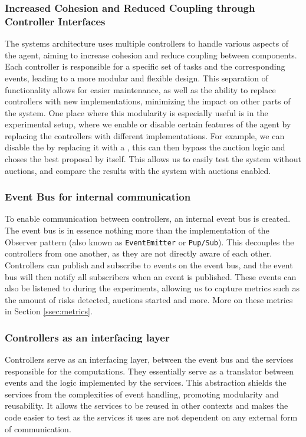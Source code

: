 \subsubsection{Increased Cohesion and Reduced Coupling through Controller Interfaces}
\label{sssec:reduced-cohesion-coupling}
The systems architecture uses multiple controllers to handle various aspects of the agent, aiming to increase cohesion and reduce coupling between components. Each controller is responsible for a specific set of tasks and the corresponding events, leading to a more modular and flexible design. This separation of functionality allows for easier maintenance, as well as the ability to replace controllers with new implementations, minimizing the impact on other parts of the system. One place where this modularity is especially useful is in the experimental setup, where we enable or disable certain features of the agent by replacing the controllers with different implementations. For example, we can disable the  by replacing it with a , this can then bypass the auction logic and choses the best proposal by itself. This allows us to easily test the system without auctions, and compare the results with the system with auctions enabled.

\subsubsection{Event Bus for internal communication}
\label{sssec:event-bus}
To enable communication between controllers, an internal event bus is created. The event bus is in essence nothing more than the implementation of the Observer pattern (also known as \texttt{EventEmitter} or \texttt{Pup/Sub})\cite{gamma1995design}. This decouples the controllers from one another, as they are not directly aware of each other. Controllers can publish and subscribe to events on the event bus, and the event bus will then notify all subscribers when an event is published. These events can also be listened to during the experiments, allowing us to capture metrics such as the amount of risks detected, auctions started and more. More on these metrics in Section \ref{ssec:metrics}.

\subsubsection{Controllers as an interfacing layer}
\label{sssec:controllers-interfacing-layer}
Controllers serve as an interfacing layer, between the event bus and the services responsible for the computations. They essentially serve as a translator between events and the logic implemented by the services. This abstraction shields the services from the complexities of event handling, promoting modularity and reusability. It allows the services to be reused in other contexts and makes the code easier to test as the services it uses are not dependent on any external form of communication.

